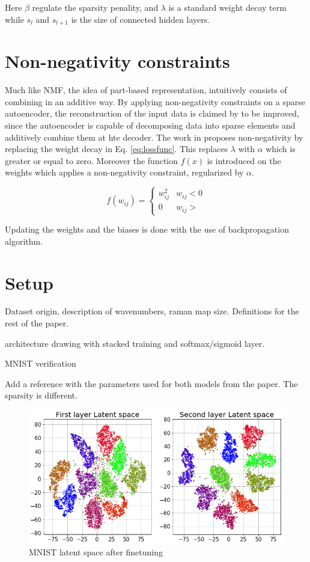 \documentclass{article}
\begin{document}
Here $\beta$ regulate the sparsity penality, and $\lambda$ is a standard weight decay term while $s_l$ and $s_{l+1}$ is the size of connected hidden layers. 

\section{Non-negativity constraints}
\label{sec:prior}

Much like NMF, the idea of part-based representation, intuitively consists of combining in an additive way. By applying non-negativity constraints on a sparse autoencoder, the reconstruction of the input data is claimed by \cite{Hosseini-Asl2016} to be improved, since the autoencoder is capable of decomposing data into sparse elements and additively combine them at hte decoder. The work in \cite{Hosseini-Asl2016} proposes non-negativity by replacing the weight decay in Eq. \ref{eq:lossfunc}. This replaces $\lambda$ with $\alpha$ which is greater or equal to zero. Moreover the function $f(x)$ is introduced on the weights which applies a non-negativity constraint, regularized by $\alpha$. 

\begin{equation}
f(w_{ij}) = \begin{cases}
  w_{ij}^2 & w_{ij} < 0 \\
  0 & w_{ij} >
\end{cases} 
\end{equation}

Updating the weights and the biases is done with the use of backpropagation algorithm. 

\section{Setup}
\label{sec:setup}

Dataset origin, description of wavenumbers, raman map size. Definitions for the rest of the paper.

architecture drawing with stacked training and softmax/sigmoid layer.

MNIST verification

Add a reference with the parameters used for both models from the paper. The sparsity is different.

\begin{figure}[H]
	\centering
	\includegraphics[width=1\linewidth]{figures_3/latent_space_finetune_no_legend.png}  
	\caption{MNIST latent space after finetuning}
\end{figure}
\end{document}
